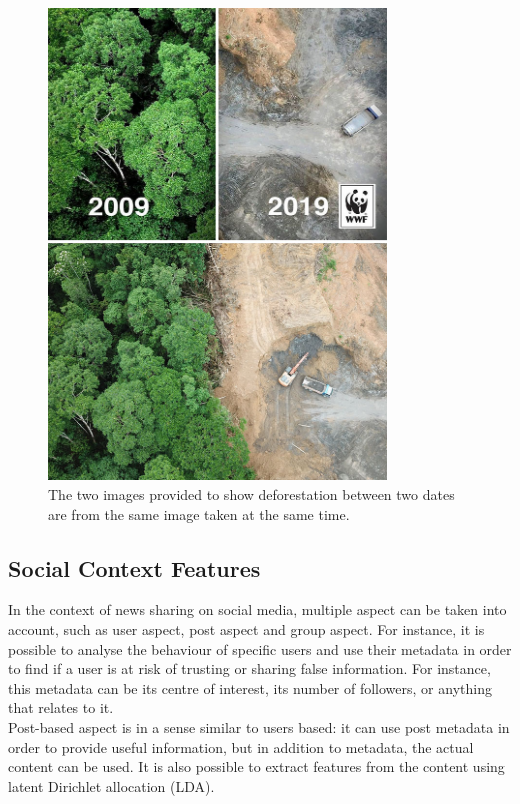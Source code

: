 \begin{figure}
 \centering
 \includegraphics[width=0.8\textwidth]{images/introduction/fake-news-photos-viral-photoshop-8-5c6fe61f88240__700}
 \caption{The two images provided to show deforestation between two dates are from the same image taken at the same time. \cite{WWF2019}}
 \label{fig:intro:deforestation}
\end{figure}

\subsection{Social Context Features}
In the context of news sharing on social media, multiple aspect can be taken into account, such as user aspect, post aspect and group aspect. For instance, it is possible to analyse the behaviour of specific users and use their metadata in order to find if a user is at risk of trusting or sharing false information. For instance, this metadata can be its centre of interest, its number of followers, or anything that relates to it. \\

Post-based aspect is in a sense similar to users based: it can use post metadata in order to provide useful information, but in addition to metadata, the actual content can be used. It is also possible to extract features from the content using latent Dirichlet allocation (LDA)\cite{blei2003latent}.

